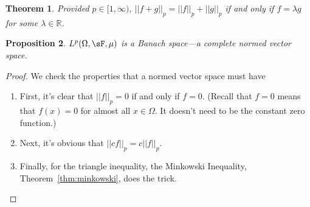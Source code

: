 \documentclass[12pt]{article}
\theoremstyle{plain}
\newtheorem{thm}{Theorem}[section]
\newtheorem{prop}[thm]{Proposition}
\theoremstyle{definition}
\theoremstyle{remark}
\begin{document}


\begin{thm}
Provided $p\in[1,\infty)$, $|| f+g||_p=|| f||_p+|| g||_p$ if and only if
$f=\lambda g$ for some $\lambda\in \mathbb{R}$.
\end{thm}

\begin{prop}
$L^p(\Omega,\sF,\mu)$ is a Banach space---a complete normed vector
space.
\end{prop}
\begin{proof}
We check the properties that a normed vector space must have
\begin{enumerate}
  \item First, it's clear that $|| f||_p=0$ if and only if
    $f=0$. (Recall that $f=0$ means that $f(x)=0$ for almost all
    $x\in\Omega$. It doesn't need to be the constant zero function.)
  \item Next, it's obvious that $|| cf||_p = c|| f||_p$.
  \item Finally, for the triangle inequality, the Minkowski Inequality,
    Theorem~\ref{thm:minkowski}, does the trick.
\end{enumerate}
\end{proof}
\end{document}
